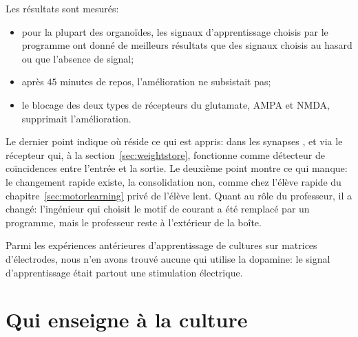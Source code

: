Les résultats sont mesurés:
\begin{itemize}
\item pour la plupart des organoïdes, les signaux d'apprentissage choisis par le programme ont donné de meilleurs résultats que des signaux choisis au hasard ou que l'absence de signal;
\item après $45$ minutes de repos, l'amélioration ne subsistait pas;
\item le blocage des deux types de récepteurs du glutamate, AMPA et NMDA, supprimait l'amélioration.
\end{itemize}

Le dernier point indique où réside ce qui est appris: dans les synapses , et via le récepteur qui, à la section~\ref{sec:weightstore}, fonctionne comme détecteur de coïncidences entre l'entrée et la sortie. Le deuxième point montre ce qui manque: le changement rapide existe, la consolidation non, comme chez l'élève rapide du chapitre~\ref{sec:motorlearning} privé de l'élève lent. Quant au rôle du professeur, il a changé: l'ingénieur qui choisit le motif de courant a été remplacé par un programme, mais le professeur reste à l'extérieur de la boîte.

Parmi les expériences antérieures d'apprentissage de cultures sur matrices d'électrodes, nous n'en avons trouvé aucune qui utilise la dopamine: le signal d'apprentissage était partout une stimulation électrique.

\section{Qui enseigne à la culture}

